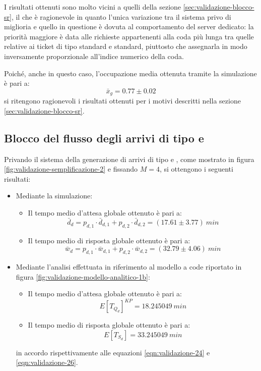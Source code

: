 I risultati ottenuti sono molto vicini a quelli della sezione \ref{sec:validazione-blocco-sr}, il che è ragionevole in quanto l'unica variazione tra il sistema privo di miglioria e quello in questione è dovuta al comportamento del server dedicato: la priorità maggiore è data alle richieste appartenenti alla coda più lunga tra quelle relative ai ticket di tipo \uo{} standard e \pp{} standard, piuttosto che assegnarla in modo inversamente proporzionale all'indice numerico della coda.

Poiché, anche in questo caso, l'occupazione media ottenuta tramite la simulazione è pari a:
\begin{equation}
\bar{x}_g = 0.77 \pm 0.02
\end{equation}
si ritengono ragionevoli i risultati ottenuti per i motivi descritti nella sezione \ref{sec:validazione-blocco-sr}.

\subsection{Blocco del flusso degli arrivi di tipo \uo{} e \pp{}}
Privando il sistema della generazione di arrivi di tipo \uo{} e \pp{}, come mostrato in figura \ref{fig:validazione-semplificazione-2} e fissando $M = 4$, si ottengono i seguenti risultati:
\begin{itemize}
\item Mediante la simulazione:
\begin{itemize}
\item Il tempo medio d'attesa globale ottenuto è pari a:
\begin{equation} 
\bar{d}_d = p_{d,1}\cdot \bar{d}_{d,1} + p_{d,2}\cdot \bar{d}_{d,2} = (17.61 \pm 3.77)\ min
\end{equation}
\item Il tempo medio di risposta globale ottenuto è pari a:
\begin{equation}
\bar{w}_d = p_{d,1}\cdot \bar{w}_{d,1} + p_{d,2}\cdot \bar{w}_{d,2} = (32.79 \pm 4.06)\ min
\end{equation}
\end{itemize}

\item Mediante l'analisi effettuata in riferimento al modello a code riportato in figura \ref{fig:validazione-modello-analitico-1b}:
\begin{itemize}
\item Il tempo medio d'attesa globale ottenuto è pari a:
\begin{equation}
E[T_{Q_d}]^{KP} = 18.245049\ min 
\end{equation}
\item Il tempo medio di risposta globale ottenuto è pari a:
\begin{equation}
E[T_{S_d}] = 33.245049\ min 
\end{equation}
\end{itemize}
in accordo rispettivamente alle equazioni \ref{eqn:validazione-24} e \ref{eqn:validazione-26}.
\end{itemize}

